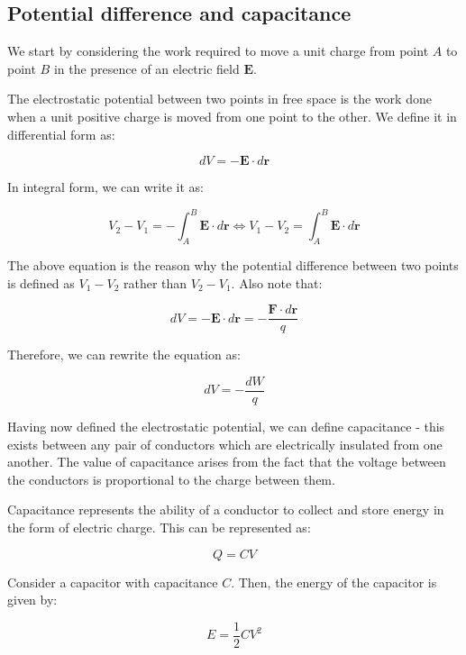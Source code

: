 \documentclass{article}
\begin{document}
\newpage

\subsection{Potential difference and capacitance}

We start by considering the work required to move a unit charge from point $A$ to point $B$ in the presence of an electric field $\mathbf{E}$. 

\begin{definition}
   The electrostatic potential between two points in free space is the work done when a unit positive charge is moved from one point to the other. We define it in differential form as:

   \[ dV = -\mathbf{E} \cdot d\mathbf{r} \]

   In integral form, we can write it as:

   \[ V_2 - V_1 = -\int_{A}^{B} \mathbf{E}\cdot d\mathbf{r} \iff V_1 - V_2 = \int_A^B \mathbf{E}\cdot d\mathbf{r} \]
\end{definition}

The above equation is the reason why the potential difference between two points is defined as $V_1 - V_2$ rather than $V_2 - V_1$. Also note that:

\[ dV = -\mathbf{E} \cdot d\mathbf{r} = - \frac{\mathbf{F} \cdot d\mathbf{r}}{q} \]

Therefore, we can rewrite the equation as:

\[ dV = -\frac{dW}{q} \]

Having now defined the electrostatic potential, we can define capacitance - this exists between any pair of conductors which are electrically insulated from one another. The value of capacitance arises from the fact that the voltage between the conductors is proportional to the charge between them.

\begin{definition}[Capacitance]
    Capacitance represents the ability of a conductor to collect and store energy in the form of electric charge. This can be represented as:

    \[ Q = CV \]
\end{definition}

\begin{proposition}
    Consider a capacitor with capacitance $C$. Then, the energy of the capacitor is given by:

    \[ E = \frac{1}{2}CV^2 \]
\end{proposition}
\end{document}
